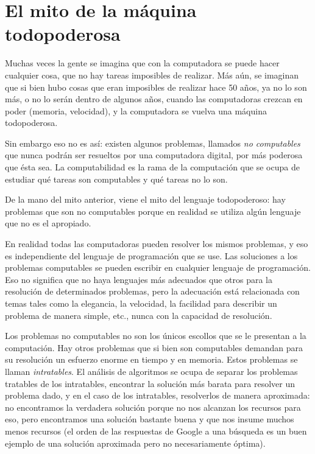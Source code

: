 \section{El mito de la máquina todopoderosa}

Muchas veces la gente se imagina que con la computadora se puede
hacer cualquier cosa, que no hay tareas imposibles de realizar.
Más aún, se imaginan que si bien hubo cosas que eran imposibles de
realizar hace 50 años, ya no lo son más, o no lo serán dentro de
algunos años, cuando las computadoras crezcan en poder (memoria,
velocidad), y la computadora se vuelva una máquina todopoderosa.

Sin embargo eso no es así: existen algunos problemas, llamados
{\it no computables} que nunca podrán ser resueltos por una
computadora digital, por más poderosa que ésta sea. La
computabilidad es la rama de la computación que se ocupa de
estudiar qué tareas son computables y qué tareas no lo son.

De la mano del mito anterior, viene el mito del lenguaje
todopoderoso: hay problemas que son no computables porque en
realidad se utiliza algún lenguaje que no es el apropiado.

En realidad todas las computadoras pueden resolver los mismos
problemas, y eso es independiente del lenguaje de programación que
se use. Las soluciones a los problemas computables se pueden
escribir en cualquier lenguaje de programación. Eso no significa
que no haya lenguajes más adecuados que otros para la resolución
de determinados problemas, pero la adecuación está relacionada con
temas tales como la elegancia, la velocidad, la facilidad para
describir un problema de manera simple, etc., nunca con la
capacidad de resolución.

Los problemas no computables no son los únicos escollos que se le
presentan a la computación. Hay otros problemas que si bien son
computables demandan para su resolución un esfuerzo enorme en
tiempo y en memoria. Estos problemas se llaman {\it intratables}.
El análisis de algoritmos se ocupa de separar los problemas
tratables de los intratables, encontrar la solución más barata
para resolver un problema dado, y en el caso de los intratables,
resolverlos de manera aproximada: no encontramos la verdadera
solución porque no nos alcanzan los recursos para eso, pero
encontramos una solución bastante buena y que nos insume muchos
menos recursos (el orden de las respuestas de Google a una
búsqueda es un buen ejemplo de una solución aproximada pero no
necesariamente óptima).

